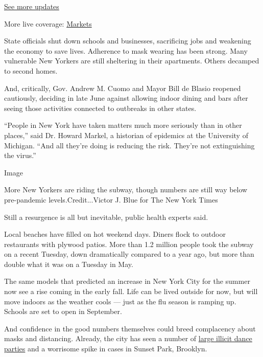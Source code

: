 \href{https://www.nytimes3xbfgragh.onion/2020/08/21/world/covid-19-coronavirus.html?action=click\&pgtype=Article\&state=default\&region=MAIN_CONTENT_1\&context=storylines_live_updates}{See
more updates}

More live coverage:
\href{https://www.nytimes3xbfgragh.onion/live/2020/08/20/business/stock-market-today-coronavirus?action=click\&pgtype=Article\&state=default\&region=MAIN_CONTENT_1\&context=storylines_live_updates}{Markets}

State officials shut down schools and businesses, sacrificing jobs and
weakening the economy to save lives. Adherence to mask wearing has been
strong. Many vulnerable New Yorkers are still sheltering in their
apartments. Others decamped to second homes.

And, critically, Gov. Andrew M. Cuomo and Mayor Bill de Blasio reopened
cautiously, deciding in late June against allowing indoor dining and
bars after seeing those activities connected to outbreaks in other
states.

``People in New York have taken matters much more seriously than in
other places,'' said Dr. Howard Markel, a historian of epidemics at the
University of Michigan. ``And all they're doing is reducing the risk.
They're not extinguishing the virus.''

Image

More New Yorkers are riding the subway, though numbers are still way
below pre-pandemic levels.Credit...Victor J. Blue for The New York Times

Still a resurgence is all but inevitable, public health experts said.

Local beaches have filled on hot weekend days. Diners flock to outdoor
restaurants with plywood patios. More than 1.2 million people took the
subway on a recent Tuesday, down dramatically compared to a year ago,
but more than double what it was on a Tuesday in May.

The same models that predicted an increase in New York City for the
summer now see a rise coming in the early fall. Life can be lived
outside for now, but will move indoors as the weather cools --- just as
the flu season is ramping up. Schools are set to open in September.

And confidence in the good numbers themselves could breed complacency
about masks and distancing. Already, the city has seen a number of
\href{https://www.nytimes3xbfgragh.onion/2020/08/08/nyregion/nyc-illegal-parties.html}{large
illicit dance parties} and a worrisome spike in cases in Sunset Park,
Brooklyn.

